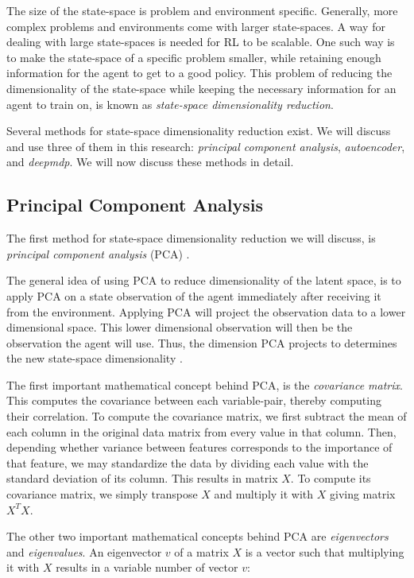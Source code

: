The size of the state-space is problem and environment specific. Generally, more complex problems and environments come with larger state-spaces. A way for dealing with large state-spaces is needed for RL to be scalable. One such way is to make the state-space of a specific problem smaller, while retaining enough information for the agent to get to a good policy. This problem of reducing the dimensionality of the state-space while keeping the necessary information for an agent to train on, is known as \emph{state-space dimensionality reduction}.  %

Several methods for state-space dimensionality reduction exist. We will discuss and use three of them in this research: \emph{principal component analysis}, \emph{autoencoder}, and \emph{deepmdp}. We will now discuss these methods in detail. %
\subsection{Principal Component Analysis}\label{pl-pca}
The first method for state-space dimensionality reduction we will discuss, is \emph{principal component analysis} (PCA) \cite{pca}. 

The general idea of using PCA to reduce dimensionality of the latent space, is to apply PCA on a state observation of the agent immediately after receiving it from the environment. Applying PCA will project the observation data to a lower dimensional space. This lower dimensional observation will then be the observation the agent will use. Thus, the dimension PCA projects to determines the new state-space dimensionality \cite{mario}.

The first important mathematical concept behind PCA, is the \emph{covariance matrix}. This computes the covariance between each variable-pair, thereby computing their correlation. To compute the covariance matrix, we first subtract the mean of each column in the original data matrix from every value in that column. Then, depending whether variance between features corresponds to the importance of that feature, we may standardize the data by dividing each value with the standard deviation of its column. This results in matrix $X$. To compute its covariance matrix, we simply transpose $X$ and multiply it with $X$ giving matrix $X^TX$.

The other two important mathematical concepts behind PCA are \emph{eigenvectors} and \emph{eigenvalues}. An eigenvector $v$ of a matrix $X$ is a vector such that multiplying it with $X$ results in a variable number of vector $v$:


